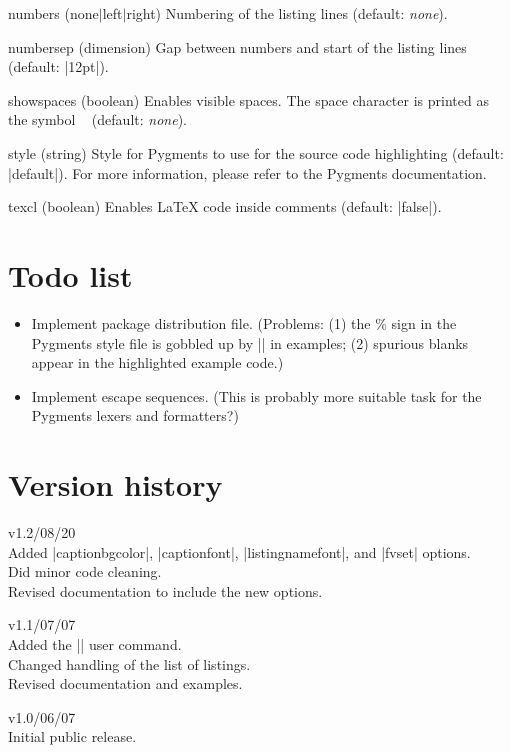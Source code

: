 \documentclass{article}
\newenvironment{optlist}{\begin{description}%
  \renewcommand\makelabel[1]{%
    \descriptionlabel{\mdseries\textsf{##1}}}%
  \itemsep0.25\itemsep}%
 {\end{description}}
\newenvironment{verlist}{\begin{description}%
  \renewcommand\makelabel[1]{%
    \descriptionlabel{\bfseries{##1}}}%
  \itemsep0.25\itemsep}%
 {\end{description}}
\begin{document}
\begin{optlist}
  \item[numbers (none$\mid$left$\mid$right)]
    Numbering of the listing lines (default: \emph{none}).
  \item[numbersep (dimension)]
   Gap between numbers and start of the listing lines (default: |12pt|).
  \item[showspaces (boolean)]
    Enables visible spaces. The space character is printed as the symbol \verb*/ / (default: \emph{none}).
  \item[style (string)]
    Style for Pygments to use for the source code highlighting (default: |default|). For more information, please refer to the Pygments documentation.
  \item[texcl (boolean)]
    Enables \LaTeX{} code inside comments (default: |false|).
\end{optlist}

\section{Todo list}

\begin{itemize}
\item Implement package distribution file. (Problems: (1) the \% sign in the Pygments style file is gobbled up by |\DocStrip| in examples; (2) spurious blanks appear in the highlighted example code.)
\item Implement escape sequences. (This is probably more suitable task for the Pygments lexers and formatters?)
\end{itemize}

\section{Version history}

\begin{verlist}
\item[v1.2\quad 2011/08/20] \mbox{}\\
Added |captionbgcolor|, |captionfont|, |listingnamefont|, and |fvset| options.\\
Did minor code cleaning.\\
Revised documentation to include the new options.

\item[v1.1\quad 2011/07/07] \mbox{}\\
Added the |\listofpyglistingsname| user command.\\
Changed handling of the list of listings.\\
Revised documentation and examples.

\item[v1.0\quad 2011/06/07] \mbox{}\\
Initial public release.
\end{verlist}
\end{document}
